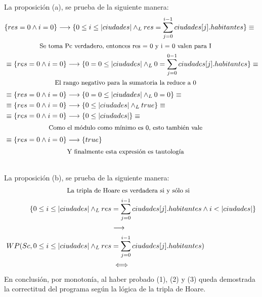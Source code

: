 \documentclass[50pt,a4paper]{article}
\begin{document}
\indent
La proposición (a), se prueba de la siguiente manera:
\begin{align*}  %
    &\{ res = 0 \land i = 0 \} \implica \{ 0 \leq i \leq |ciudades| \yLuego res = \sum\limits_{j=0}^{i - 1} ciudades[j].habitantes \} \equiv \\
    \shortintertext{\parbox{\textwidth}{\centering \small {Se toma Pc verdadero, entonces res = 0 y i = 0 valen para I}}} \notag
    &\equiv\{ res = 0 \land i = 0 \} \implica \{ 0 = 0 \leq |ciudades| \yLuego 0 = \sum\limits_{j=0}^{0 - 1} ciudades[j].habitantes \} \equiv\\
    \shortintertext{\parbox{\textwidth}{\centering \small {El rango negativo para la sumatoria la reduce a 0}}} \notag
    &\equiv\{ res = 0 \land i = 0 \} \implica \{ 0 = 0 \leq |ciudades| \yLuego 0 = 0 \} \equiv\\
    &\equiv\{ res = 0 \land i = 0 \} \implica \{ 0 \leq |ciudades| \yLuego true \} \equiv\\
    &\equiv\{ res = 0 \land i = 0 \} \implica \{ 0 \leq |ciudades| \} \equiv\\
    \shortintertext{\parbox{\textwidth}{\centering \small {Como el módulo como mínimo es 0, esto también vale}}} \notag
    &\equiv\{ res = 0 \land i = 0 \} \implica \{ true \} \\
    \shortintertext{\parbox{\textwidth}{\centering \small {Y finalmente esta expresión es tautología}}} \notag
\end{align*}
\indent
La proposición (b), se prueba de la siguiente manera:
\begin{align*}
    \shortintertext{\parbox{\textwidth}{\centering \small {La tripla de Hoare es verdadera si y sólo si}}} \notag
    \{ 0 \leq i \leq |ciudades| \yLuego res &= \sum\limits_{j=0}^{i - 1} ciudades[j].habitantes \land i < |ciudades| \}\\
     &\implica \\
     WP(Sc, 0 \leq i \leq |ciudades| \yLuego res &= \sum\limits_{j=0}^{i - 1} ciudades[j].habitantes)\\
     &\iff\\
     
\end{align*}
\indent
En conclusión, por monotonía, al haber probado (1), (2) y (3) queda demostrada la correctitud del programa según la lógica de la tripla de Hoare.
\end{document}
